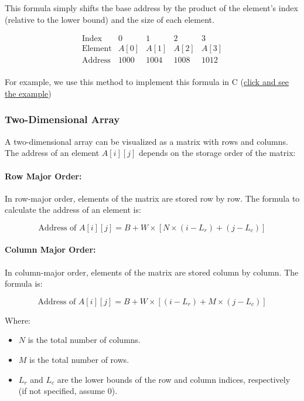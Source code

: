 \documentclass{book}
\begin{document}
This formula simply shifts the base address by the product of the element's index (relative to the lower bound) and the size of each element.

\[
\begin{array}{c|c|c|c|c}
	\text{Index} & 0 & 1 & 2 & 3 \\
	\hline
	\text{Element} & A[0] & A[1] & A[2] & A[3] \\
	\hline
	\text{Address} & 1000 & 1004 & 1008 & 1012 \\
\end{array}
\]

For example, we use this method to implement this formula in C (\href{https://github.com/m-mdy-m/Arliz/blob/main/AddressCalculation/one-dimensional.c}{click and see the example})

\subsubsection{Two-Dimensional Array}

A two-dimensional array can be visualized as a matrix with rows and columns. The address of an element \( A[i][j] \) depends on the storage order of the matrix:

\paragraph{Row Major Order:}

In row-major order, elements of the matrix are stored row by row. The formula to calculate the address of an element is:

\[
\text{Address of } A[i][j] = B + W \times \left[ N \times (i - L_r) + (j - L_c) \right]
\]

\paragraph{Column Major Order:}

In column-major order, elements of the matrix are stored column by column. The formula is:

\[
\text{Address of } A[i][j] = B + W \times \left[ (i - L_r) + M \times (j - L_c) \right]
\]

Where:
\begin{itemize}
	\item \( N \) is the total number of columns.
	\item \( M \) is the total number of rows.
	\item \( L_r \) and \( L_c \) are the lower bounds of the row and column indices, respectively (if not specified, assume 0).
\end{itemize}
\end{document}

